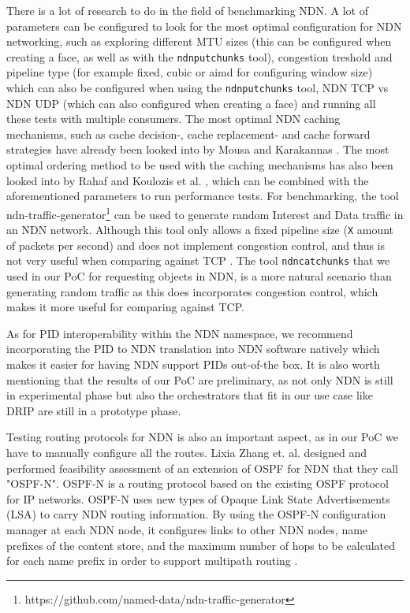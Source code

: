 There is a lot of research to do in the field of benchmarking NDN. A lot of parameters can be configured to look for the most optimal configuration for NDN networking, such as exploring different MTU sizes (this can be configured when creating a face, as well as with the \texttt{ndnputchunks} tool), congestion treshold and pipeline type (for example fixed, cubic or aimd for configuring window size) which can also be configured when using the \texttt{ndnputchunks} tool, NDN TCP vs NDN UDP (which can also configured when creating a face) and running all these tests with multiple consumers. 
The most optimal NDN caching mechanisms, such as cache decision-, cache replacement- and cache forward strategies have already been looked into by Mousa \cite{ndn-app-aware} and Karakannas \cite{icn-bd}. The most optimal ordering method to be used with the caching mechanisms has also been looked into by Rahaf and Koulozis et al. \cite{koulouzis2018information}, which can be combined with the aforementioned parameters to run performance tests.
For benchmarking, the tool ndn-traffic-generator\footnote{https://github.com/named-data/ndn-traffic-generator} can be used to generate random Interest and Data traffic in an NDN network. Although this tool only allows a fixed pipeline size (\texttt{X} amount of packets per second) and does not implement congestion control, and thus is not very useful when comparing against TCP \cite{ndnput-mem}. The tool \texttt{ndncatchunks} that we used in our PoC for requesting objects in NDN, is a more natural scenario than generating random traffic as this does incorporates congestion control, which makes it more useful for comparing against TCP.

As for PID interoperability within the NDN namespace, we recommend incorporating the PID to NDN translation into NDN software natively which makes it easier for having NDN support PIDs out-of-the box. It is also worth mentioning that the results of our PoC are preliminary, as not only NDN is still in experimental phase but also the orchestrators that fit in our use case like DRIP are still in a prototype phase.
 
 
Testing routing protocols for NDN is also an important aspect, as in our PoC we have to manually configure all the routes. Lixia Zhang et. al. designed and performed feasibility assessment of an extension of OSPF for NDN that they call "OSPF-N". OSPF-N is a routing protocol based on the existing OSPF protocol for IP networks. OSPF-N uses new types of Opaque Link State Advertisements (LSA) to carry NDN routing information. By using the OSPF-N configuration manager at each NDN node, it configures links to other NDN nodes, name prefixes of the content store, and the maximum number of hops to be calculated for each name prefix in order to support multipath routing \cite{ndn-ospfn}.
 
